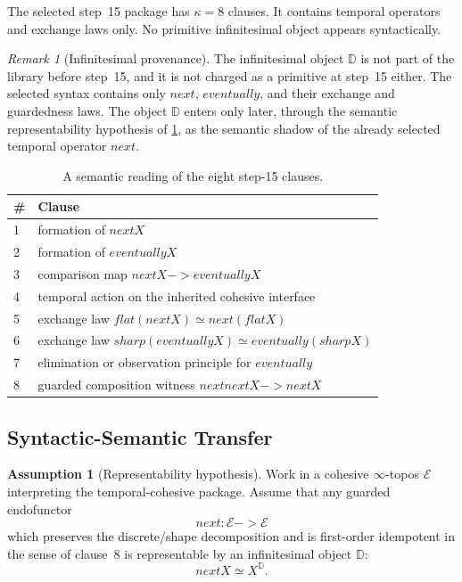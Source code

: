 \documentclass[11pt,a4paper]{article}
\def\to{->}%
\def\flat{flat}%
\def\sharp{sharp}%
\def\bigcirc{next}%
\def\Diamond{eventually}%
\theoremstyle{plain}
\theoremstyle{definition}
\newtheorem{assumption}[theorem]{Assumption}
\theoremstyle{remark}
\newtheorem{remark}[theorem]{Remark}
\newcommand{\D}{\mathbb{D}}
\begin{document}
The selected step~15 package has $\kappa=8$ clauses.  It contains temporal operators and exchange laws only.  No primitive infinitesimal object appears syntactically.

\begin{remark}[Infinitesimal provenance]
\label{rem:infinitesimal-provenance}
The infinitesimal object $\D$ is not part of the library before step~15, and it is not charged as a primitive at step~15 either.  The selected syntax contains only $\bigcirc$, $\Diamond$, and their exchange and guardedness laws.  The object $\D$ enters only later, through the semantic representability hypothesis of \cref{ass:representability}, as the semantic shadow of the already selected temporal operator $\bigcirc$.
\end{remark}

\begin{table}[tbp]
\centering
\caption{A semantic reading of the eight step-15 clauses.}
\label{tab:step15}
\small
\begin{tabular}{@{}ll@{}}
\toprule
\# & Clause \\
\midrule
1 & formation of $\bigcirc X$ \\
2 & formation of $\Diamond X$ \\
3 & comparison map $\bigcirc X \to \Diamond X$ \\
4 & temporal action on the inherited cohesive interface \\
5 & exchange law $\flat(\bigcirc X)\simeq \bigcirc(\flat X)$ \\
6 & exchange law $\sharp(\Diamond X)\simeq \Diamond(\sharp X)$ \\
7 & elimination or observation principle for $\Diamond$ \\
8 & guarded composition witness $\bigcirc\bigcirc X\to \bigcirc X$ \\
\bottomrule
\end{tabular}
\end{table}

\subsection{Syntactic-Semantic Transfer}

\begin{assumption}[Representability hypothesis]
\label{ass:representability}
Work in a cohesive $\infty$-topos $\mathcal E$ interpreting the temporal-cohesive package.  Assume that any guarded endofunctor
\[
  \bigcirc:\mathcal E\to\mathcal E
\]
which preserves the discrete/shape decomposition and is first-order idempotent in the sense of clause~8 is representable by an infinitesimal object $\D$:
\[
  \bigcirc X \simeq X^\D.
\]
\end{assumption}
\end{document}
